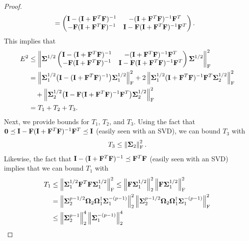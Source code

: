 \begin{proof}
\begin{align}
  & = \begin{pmatrix} 
  \mathbf{I} - (\mathbf{I} + \mathbf{F}^T \mathbf{F})^{-1} & -(\mathbf{I} + \mathbf{F}^T \mathbf{F})^{-1} \mathbf{F}^T \\
   -\mathbf{F} (\mathbf{I} + \mathbf{F}^T \mathbf{F})^{-1} & \mathbf{I} - \mathbf{F} (\mathbf{I} + \mathbf{F}^T \mathbf{F})^{-1} \mathbf{F}^T
    \end{pmatrix}.
 \label{ch4:eqn:pzestimate}
\end{align}
This implies that
\begin{equation}
\label{ch4:eqn:frobenius-partitioned-estimate}
\begin{split}
 E^2 & \leq \left\|\mathbf{\Sigma}^{1/2} \begin{pmatrix} 
			\mathbf{I} - (\mathbf{I} + \mathbf{F}^T \mathbf{F})^{-1} & -(\mathbf{I} + \mathbf{F}^T \mathbf{F})^{-1} \mathbf{F}^T \\
                        -\mathbf{F} (\mathbf{I} + \mathbf{F}^T \mathbf{F})^{-1} & \mathbf{I} - \mathbf{F} (\mathbf{I} + \mathbf{F}^T \mathbf{F})^{-1} \mathbf{F}^T
                       \end{pmatrix}
                \mathbf{\Sigma}^{1/2}\right\|_\mathrm{F}^2 \\
 & = \left\|\mathbf{\Sigma}_1^{1/2} \big(\mathbf{I} - (\mathbf{I} + \mathbf{F}^T \mathbf{F})^{-1}\big) \mathbf{\Sigma}_1^{1/2}\right\|_\mathrm{F}^2 + 
     2 \left\|\mathbf{\Sigma}_1^{1/2} (\mathbf{I} + \mathbf{F}^T \mathbf{F})^{-1} \mathbf{F}^T \mathbf{\Sigma}_2^{1/2}\right\|_\mathrm{F}^2 \\
   & \quad + \left\|\mathbf{\Sigma}_2^{1/2} \big(\mathbf{I} - \mathbf{F} (\mathbf{I} + \mathbf{F}^T \mathbf{F})^{-1} \mathbf{F}^T \big) \mathbf{\Sigma}_2^{1/2}\right\|_\mathrm{F}^2 \\
 & = T_1 + T_2 + T_3.
\end{split}
\end{equation}
Next, we provide bounds for $T_1$, $T_2$, and $T_3$.
Using the fact that 
$\mathbf{0} \preceq \mathbf{I} - \mathbf{F}(\mathbf{I} + \mathbf{F}^T \mathbf{F})^{-1}\mathbf{F}^T \preceq \mathbf{I}$ 
 (easily seen with an SVD), we can bound $T_3$ with
\[
 T_3 \leq \left\|\mathbf{\Sigma}_2\right\|_\mathrm{F}^2.
\]
Likewise, the fact that
$\mathbf{I} - (\mathbf{I} + \mathbf{F}^T\mathbf{F})^{-1} \preceq \mathbf{F}^T\mathbf{F}$ 
(easily seen with an SVD) implies that we can bound $T_1$ with
\begin{align*}
 T_1 & \leq \FNormS{\matSig_1^{1/2} \matF\transp \matF \matSig_1^{1/2}} 
       \leq \TNormS{\matF \matSig_1^{1/2}} \FNormS{\matF \matSig_1^{1/2}} \\
     & = \TNormS{\matSig_2^{p-1/2} 
                    \matOmega_2 \matOmega_1^\pinv \matSig_1^{-(p-1)}}
            \FNormS{\matSig_2^{p-1/2} 
                    \matOmega_2 \matOmega_1^\pinv \matSig_1^{-(p-1)}} \\
     & \leq \TNorm{\matSig_2^{p-1}}^4 \TNorm{\matSig_1^{-(p-1)}}^4

\end{align*}
\end{proof}
